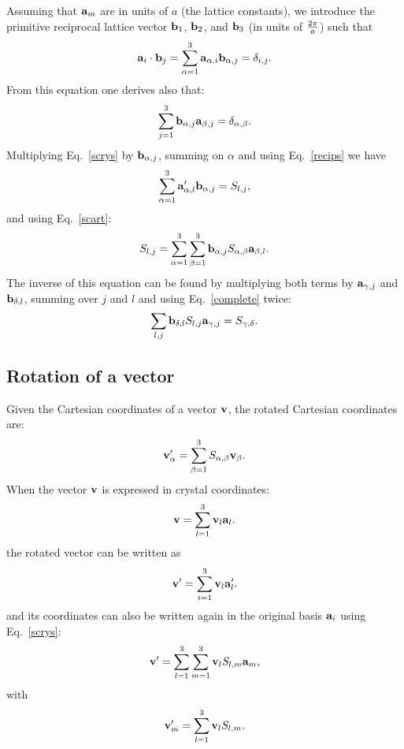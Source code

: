 \documentclass[12pt,a4paper,twoside]{report}
\begin{document}
Assuming that ${\bf a}_m$ are in units of $a$ (the lattice constants), we
introduce the primitive reciprocal lattice vector ${\bf b}_1$, ${\bf b}_2$,
and ${\bf b}_3$ (in units of $2\pi \over a$) such that
\begin{equation}
{\bf a}_i \cdot {\bf b}_j = \sum_{\alpha=1}^3 {\bf a}_{\alpha,i} {\bf b}_{\alpha, j} =  \delta_{i,j}.
\label{recips}
\end{equation}
From this equation one derives also that:
\begin{equation}
\sum_{j=1}^3 {\bf b}_{\alpha, j} {\bf a}_{\beta, j} =  \delta_{\alpha,\beta}.
\label{complete}
\end{equation}
Multiplying Eq.~\ref{scrys} by ${\bf b}_{\alpha, j}$, summing on $\alpha$ and
using Eq.~\ref{recips} we have
\begin{equation}
\sum_{\alpha=1}^3 {\bf a}'_{\alpha,l} {\bf b}_{\alpha, j} = S_{l,j},
\end{equation}
and using Eq.~\ref{scart}:
\begin{equation}
S_{l,j} =\sum_{\alpha=1}^3 \sum_{\beta=1}^3 {\bf b}_{\alpha, j} S_{\alpha,\beta} {\bf a}_{\beta,l}.
\label{slj}
\end{equation}
The inverse of this equation can be found by multiplying both terms by
${\bf a}_{\gamma,j}$ and ${\bf b}_{\delta,l}$, summing over $j$ and $l$ and
using Eq.~\ref{complete} twice:
\begin{equation}
\sum_{l,j} {\bf b}_{\delta,l} S_{l,j} {\bf a}_{\gamma,j} = S_{\gamma,\delta}.
\end{equation}

\subsection{Rotation of a vector}
Given the Cartesian coordinates of a vector
${\bf v}$, the rotated Cartesian coordinates are:
\begin{equation}
{\bf v}'_\alpha = \sum_{\beta=1}^3 S_{\alpha,\beta} {\bf v}_\beta.
\end{equation}
When the vector ${\bf v}$ is expressed in crystal coordinates:
\begin{equation}
{\bf v} = \sum_{l=1}^3 {\bf v}_l {\bf a}_l.
\end{equation}
the rotated vector can be written as
\begin{equation}
{\bf v}' = \sum_{i=1}^3 {\bf v}_l {\bf a}'_l.
\end{equation}
and its coordinates can also be written again in the original basis
${\bf a}_i$ using Eq.~\ref{scrys}:
\begin{equation}
{\bf v}' = \sum_{l=1}^3 \sum_{m=1}^3 {\bf v}_l S_{l,m} {\bf a}_m,
\end{equation}
with
\begin{equation}
{\bf v}'_m = \sum_{l=1}^3 {\bf v}_l S_{l,m}.
\label{rotvcry}
\end{equation}
\end{document}
